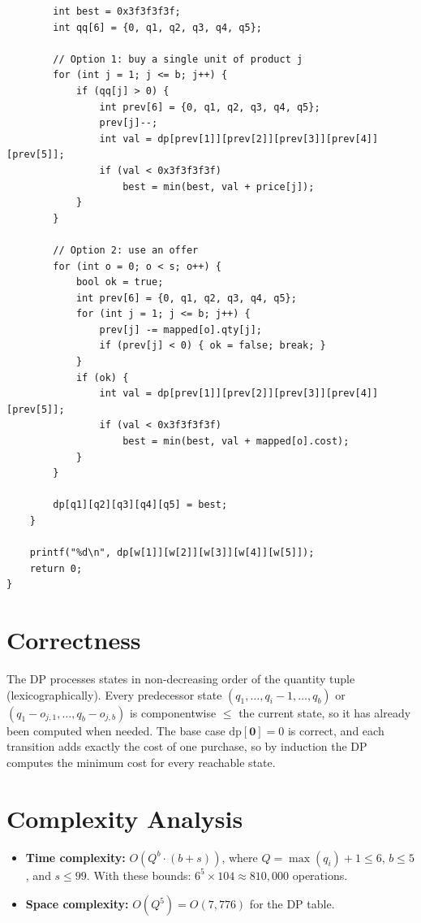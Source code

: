 \documentclass[11pt,a4paper]{article}
\begin{document}
\begin{lstlisting}
        int best = 0x3f3f3f3f;
        int qq[6] = {0, q1, q2, q3, q4, q5};

        // Option 1: buy a single unit of product j
        for (int j = 1; j <= b; j++) {
            if (qq[j] > 0) {
                int prev[6] = {0, q1, q2, q3, q4, q5};
                prev[j]--;
                int val = dp[prev[1]][prev[2]][prev[3]][prev[4]][prev[5]];
                if (val < 0x3f3f3f3f)
                    best = min(best, val + price[j]);
            }
        }

        // Option 2: use an offer
        for (int o = 0; o < s; o++) {
            bool ok = true;
            int prev[6] = {0, q1, q2, q3, q4, q5};
            for (int j = 1; j <= b; j++) {
                prev[j] -= mapped[o].qty[j];
                if (prev[j] < 0) { ok = false; break; }
            }
            if (ok) {
                int val = dp[prev[1]][prev[2]][prev[3]][prev[4]][prev[5]];
                if (val < 0x3f3f3f3f)
                    best = min(best, val + mapped[o].cost);
            }
        }

        dp[q1][q2][q3][q4][q5] = best;
    }

    printf("%d\n", dp[w[1]][w[2]][w[3]][w[4]][w[5]]);
    return 0;
}
\end{lstlisting}

\section{Correctness}

The DP processes states in non-decreasing order of the quantity tuple (lexicographically).
Every predecessor state $(q_1, \ldots, q_i - 1, \ldots, q_b)$ or
$(q_1 - o_{j,1}, \ldots, q_b - o_{j,b})$ is componentwise $\le$ the current state,
so it has already been computed when needed. The base case $\mathrm{dp}[\mathbf{0}] = 0$
is correct, and each transition adds exactly the cost of one purchase, so by induction
the DP computes the minimum cost for every reachable state.

\section{Complexity Analysis}

\begin{itemize}
  \item \textbf{Time complexity:} $O(Q^b \cdot (b + s))$, where $Q = \max(q_i) + 1 \le 6$,
        $b \le 5$, and $s \le 99$. With these bounds: $6^5 \times 104 \approx 810{,}000$ operations.
  \item \textbf{Space complexity:} $O(Q^5) = O(7{,}776)$ for the DP table.
\end{itemize}
\end{document}

